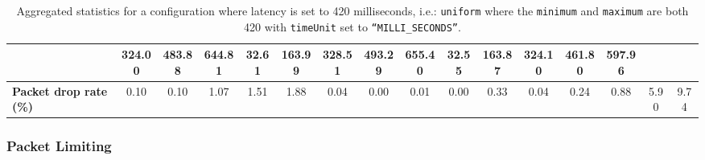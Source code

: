 \begin{table}[!h]
{\begin{tabular}{|l|ccccc|ccccc|ccccc|}
            & \multicolumn{1}{c|}{324.00}
            & \multicolumn{1}{c|}{483.88}
            & \multicolumn{1}{c|}{644.81}
            & \multicolumn{1}{c|}{32.61}
            & \multicolumn{1}{c|}{163.99}
            & \multicolumn{1}{c|}{328.51}
            & \multicolumn{1}{c|}{493.29}
            & \multicolumn{1}{c|}{655.40}
            & \multicolumn{1}{c|}{32.55}
            & \multicolumn{1}{c|}{163.87}
            & \multicolumn{1}{c|}{324.10}
            & \multicolumn{1}{c|}{461.80}
            & \multicolumn{1}{c|}{597.96}
            \\ \hline
            \textbf{Packet drop rate (\%)} & \multicolumn{1}{c|}{0.10} & \multicolumn{1}{c|}{0.10}
            & \multicolumn{1}{c|}{1.07}
            & \multicolumn{1}{c|}{1.51}
            & \multicolumn{1}{c|}{1.88}
            & \multicolumn{1}{c|}{0.04}
            & \multicolumn{1}{c|}{0.00}
            & \multicolumn{1}{c|}{0.01}
            & \multicolumn{1}{c|}{0.00}
            & \multicolumn{1}{c|}{0.33}
            & \multicolumn{1}{c|}{0.04}
            & \multicolumn{1}{c|}{0.24}
            & \multicolumn{1}{c|}{0.88}
            & \multicolumn{1}{c|}{5.90}
            & \multicolumn{1}{c|}{9.74}
            \\ \hline
        \end{tabular}
    }
    \caption{Aggregated statistics for a configuration where latency is set to 420 milliseconds, i.e.:
    \texttt{uniform} where the \texttt{minimum} and \texttt{maximum} are both 420 with \texttt{timeUnit} set to
    \texttt{``MILLI\_SECONDS''}.}
    \label{table:analysis_results_latency}
\end{table}

\subsubsection{Packet Limiting}\label{subsubsection:limit_analysis}

